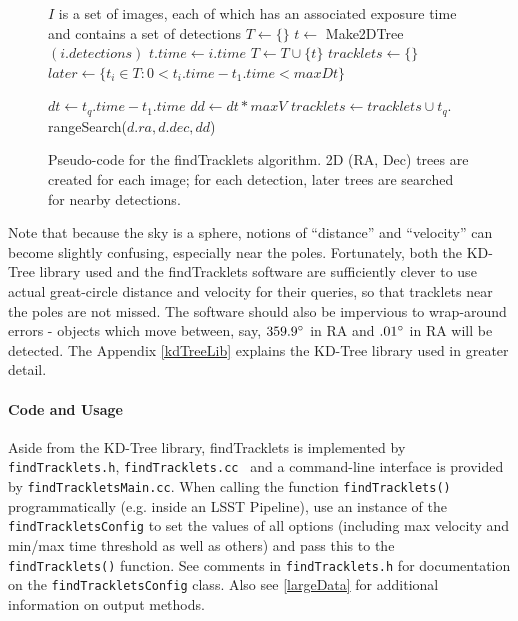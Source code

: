\begin{figure}[ht!]
\begin{algorithmic}
\REQUIRE $I$ is a set of images, each of which has an associated exposure time and contains a set of detections
\STATE {}
\STATE $T \gets \{\}$
  \STATE $t \gets$ Make2DTree$(i.detections)$
  \STATE $t.time \gets i.time$
  \STATE $T \gets T \cup \{t\}$
\ENDFOR
\STATE {}
\STATE $tracklets \gets \{\}$
  \STATE $later \gets \{t_i \in T : 0 < t_i.time - t_1.time < maxDt\}$
 
       \STATE {}

        \STATE $dt \gets t_q.time - t_1.time$
        \STATE $dd \gets dt * maxV$
        \STATE {}
        \STATE $tracklets \gets tracklets \cup t_q.$rangeSearch($d.ra, d.dec, dd$)
     \ENDFOR
   \ENDFOR
\ENDFOR
{}
\end{algorithmic}

\caption{Pseudo-code for the findTracklets algorithm.  2D (RA, Dec)
  trees are created for each image; for each detection, later trees
  are searched for nearby detections. }
 \label{findTrackletsAlgorithm}
\end{figure}


Note that because the sky is a sphere, notions of ``distance'' and
``velocity'' can become slightly confusing, especially near the poles.
Fortunately, both the KD-Tree library used and the findTracklets
software are sufficiently clever to use actual great-circle distance
and velocity for their queries, so that tracklets near the poles are
not missed.  The software should also be impervious to wrap-around
errors - objects which move between, say, $359.9 \degree$ in RA and
$.01 \degree$ in RA will be detected.  The Appendix \ref{kdTreeLib}
explains the KD-Tree library used in greater detail.  

\paragraph{Code and Usage}
Aside from the KD-Tree library, findTracklets is implemented by {\tt
  findTracklets.h}, {\tt findTracklets.cc } and a command-line
interface is provided by {\tt findTrackletsMain.cc}.  When calling the
function {\tt findTracklets()} programmatically (e.g. inside an LSST
Pipeline), use an instance of the {\tt findTrackletsConfig} to set the
values of all options (including max velocity and min/max time
threshold as well as others) and pass this to the {\tt
  findTracklets()} function.  See comments in {\tt findTracklets.h}
for documentation on the {\tt findTrackletsConfig} class.  Also see
\ref{largeData} for additional information on output methods.

